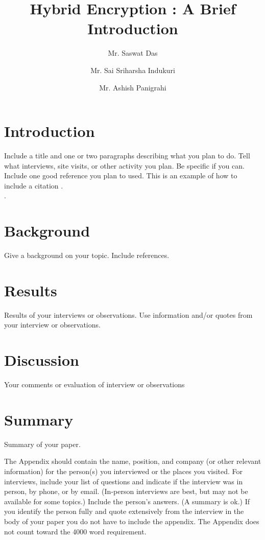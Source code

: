 \documentclass[journal]{IEEEtran}
\begin{document}
\title{Hybrid Encryption : A Brief Introduction}

\author[1]{Mr. Saswat Das}%
\author[2]{Mr. Sai Sriharsha Indukuri}\author[3]{Mr. Ashish Panigrahi}%

\maketitle


\section{Introduction }
Include a title and one or two paragraphs describing what you plan to do. Tell what interviews, site visits, or other activity you plan. Be specific if you can. Include  one good reference you plan to used. This is an example of how to include a citation \cite{williams1989style}.  \\.

\section{Background}
Give a background on your topic. Include references.

\section{Results}
Results of your interviews or observations. Use information and/or quotes from your interview or observations.

\section{Discussion}
Your comments or evaluation of interview or observations

\section{Summary}
Summary of your paper.

\appendix
The Appendix should contain the name, position, and company (or other relevant information) for the person(s) you interviewed or the places you visited. For interviews, include your list of questions and indicate if the interview was in person, by phone, or by email. (In-person interviews are best, but may not be available for some topics.) Include the person's answers. (A summary is ok.) If you identify the person fully and quote extensively from the interview in the body of your paper you do not have to include the appendix. The Appendix does not count toward the 4000 word requirement.
\end{document}
